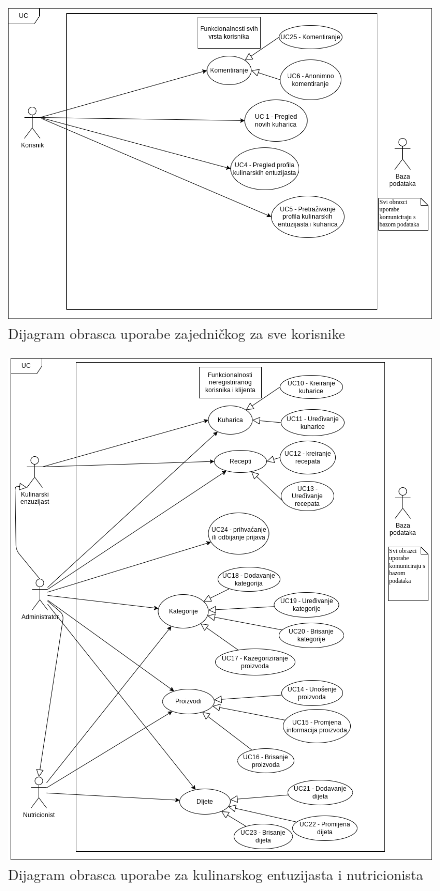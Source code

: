 					\begin{figure}[H]
						\centering
						\includegraphics[scale=0.5]{dijagrami/dijagram-obrazaca-uporabe-za-sve-korisnike.png}
						\caption{Dijagram obrasca uporabe zajedničkog za sve korisnike}
						\label{fig:uc-svi-korisnici}
					\end{figure}
					\begin{figure}[H]
						\centering
						\includegraphics[scale=0.5]{dijagrami/dijagram-obrazaca-uporabe-kulinarskog-entuzijasta-i-nutricionista.png}
						\caption{Dijagram obrasca uporabe za kulinarskog entuzijasta i nutricionista}
						\label{fig:uc-kulinarski-i-nutricionist}
					\end{figure}


